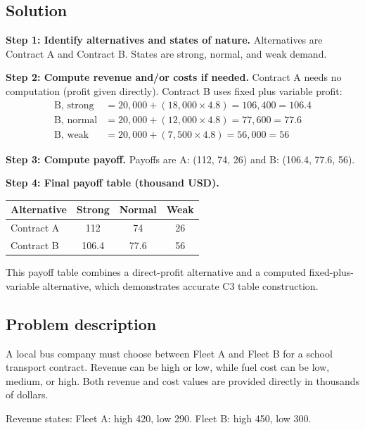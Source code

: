 \begin{ExamProblems}
		\subsection*{Solution}
		\textbf{Step 1: Identify alternatives and states of nature.} Alternatives are Contract A and Contract B. States are strong, normal, and weak demand.
		
		\textbf{Step 2: Compute revenue and/or costs if needed.} Contract A needs no computation (profit given directly). Contract B uses fixed plus variable profit:
		\[
		\begin{aligned}
		\text{B, strong} &= 20{,}000 + (18{,}000 \times 4.8) = 106{,}400 = 106.4 \\
		\text{B, normal} &= 20{,}000 + (12{,}000 \times 4.8) = 77{,}600 = 77.6 \\
		\text{B, weak} &= 20{,}000 + (7{,}500 \times 4.8) = 56{,}000 = 56
		\end{aligned}
		\]
		
		\textbf{Step 3: Compute payoff.} Payoffs are A: (112, 74, 26) and B: (106.4, 77.6, 56).
		
		\textbf{Step 4: Final payoff table (thousand USD).}
		\begin{center}
			\begin{tabular}{l c c c}
				\toprule
				Alternative & Strong & Normal & Weak \\
				\midrule
				Contract A & 112 & 74 & 26 \\
				Contract B & 106.4 & 77.6 & 56 \\
				\bottomrule
			\end{tabular}
		\end{center}
		
		This payoff table combines a direct-profit alternative and a computed fixed-plus-variable alternative, which demonstrates accurate C3 table construction.
		
		\item
		\subsection*{Problem description}
		A local bus company must choose between Fleet A and Fleet B for a school transport contract.
		Revenue can be high or low, while fuel cost can be low, medium, or high.
		Both revenue and cost values are provided directly in thousands of dollars.
		
		Revenue states:
		Fleet A: high 420, low 290.
		Fleet B: high 450, low 300.
		

\end{ExamProblems}
